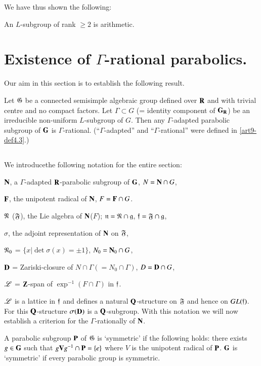 We have thus shown the following:

\begin{theorem}\label{art9-thm4.44}
An $L$-subgroup of rank $\geqslant 2$ is arithmetic.
\end{theorem}

\section{Existence of $\Gamma$-rational parabolics.}\label{art9-sec5}
Our aim in this section is to establish the following result.

\begin{maintheorem*}
Let $\mathfrak{G}$ be a connected semisimple algebraic group defined over $\mathbf{R}$ and with trivial centre and no compact factors. Let $\Gamma \subset G$ (= identity component of $\mathbf{G}_{\mathbf{R}}$) be an irreducible non-uniform $L$-subgroup of $G$. Then any $\Gamma$-adapted parabolic subgroup of $\mathbf{G}$ is $\Gamma$-rational. (``$\Gamma$-adapted'' and ``$\Gamma$-rational'' were defined in \ref{art9-def4.3}.)
\end{maintheorem*}

\subsection{}\label{art9-subsec5.1}
We introduce\pageoriginale the following notation for the entire section: 

$\mathbf{N}$, a $\Gamma$-adapted $\mathbf{R}$-parabolic subgroup of $\mathbf{G}$, $N = \mathbf{N} \cap G$, 

$\mathbf{F}$, the unipotent radical of $\mathbf{N}$, $F = \mathbf{F} \cap G$. 

$\mathfrak{N}$ (\resp $\mathfrak{F}$), the Lie algebra of $\mathbf{N}$(\resp $F$); $\mathfrak{n} = \mathfrak{N} \cap \mathfrak{g}$, $\mathfrak{f} = \mathfrak{F} \cap \mathfrak{g}$, 

$\sigma$, the adjoint representation of $\mathbf{N}$ on $\mathfrak{F}$,

$\mathfrak{N}_0$ = $\{x \big| \det \sigma (x) = \pm 1\}$, $N_0 = \mathbf{N}_0 \cap G$,

$\mathbf{D} $ = Zariski-closure of $N \cap \Gamma (= N_0 \cap \Gamma)$, $D = \mathbf{D} \cap G$,

$\mathscr{L} $ = $\mathbf{Z}$-span of $\exp^{-1} (F \cap \Gamma)$ in $\mathfrak{f}$.

$\mathscr{L}$ is a lattice in $\mathfrak{f}$ and defines a natural $\mathbf{Q}$-structure on $\mathfrak{F}$ and hence on $GL (\mathfrak{f})$. For this $\mathbf{Q}$-structure $\sigma (\mathbf{D})$ is a $\mathbf{Q}$-subgroup. With this notation we will now establish a criterion for the $\Gamma$-rationally of $\mathbf{N}$.

\setcounter{definition}{1}
\begin{definition}\label{art9-def5.2}
A parabolic subgroup $\mathbf{P}$ of $\mathfrak{G}$ is `symmetric' if the following holds: there exists $g \in\mathbf{G}$ such that $g \mathbf{V} g^{-1} \cap \mathbf{P} = \{e\}$ where $V$ is the unipotent radical of $\mathbf{P}$. $\mathbf{G}$ is `symmetric' if every parabolic group is symmetric.
\end{definition}

